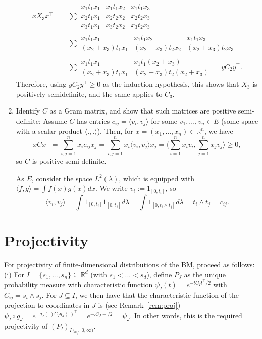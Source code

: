 \documentclass{article}
\theoremstyle{definition}
\theoremstyle{step} \newtheorem{step}{Step}
\begin{document}
\begin{enumerate}
\begin{align*}
    x X_3 x^\top & = \sum \begin{matrix} x_1 t_1 x_1 & x_1 t_1x_2 &
      x_1 t_1 x_3 \\ x_2 t_1 x_1 & x_2 t_2 x_2 & x_2 t_2x_3 \\ x_3 t_1
      x_1 & x_3 t_2 x_2& x_3 t_2x_3\end{matrix} \\ & =
      \sum \begin{matrix} x_1 t_1 x_1 & x_1 t_1x_2 & x_1 t_1 x_3
        \\ (x_2 + x_3) t_1 x_1 & (x_2 + x_3) t_2 x_2 & (x_2 +
        x_3)t_2x_3 \end{matrix} \\ & = \sum \begin{matrix} x_1 t_1 x_1
        & x_1 t_1(x_2 + x_3) \\ (x_2 + x_3) t_1 x_1 & (x_2 + x_3) t_2
        (x_2 + x_3) \end{matrix} = y C_2 y^\top.
  \end{align*}
  Therefore, using $y C_2 y^\top \geq 0$ as the induction hypothesis,
  this shows that $X_3$ is positively semidefinite, and the same
  applies to $C_3$.
\item Identify $C$ as a Gram matrix, and show that such matrices are positive semi-definite: Assume $C$ has entries $c_{ij} = \langle v_i, v_j\rangle$ for some $v_1,...,v_n \in E$ (some space with a scalar product $\langle .,. \rangle$). Then, for $x =
  (x_1,...,x_n) \in \mathbb R^n$, we have
  $$ x C x^\top = \sum_{i,j=1}^n x_i c_{ij} x_j = \sum_{i,j=1}^n
  x_i \langle v_i, v_j\rangle x_j = \langle \sum_{i=1}^n x_i v_i,
  \sum_{j=1}^n x_j v_j\rangle \geq 0,$$ so $C$ is positive semi-definite.

  As $E$, consider the space $L^2(\lambda)$, which is equipped with $\langle f, g\rangle = \int f(x)g(x) dx$. We write $v_i := 1_[0,t_i]$, so 
  $$ \langle v_i, v_j \rangle = \int 1_{[0,t_i]}1_{[0,t_j]} d\lambda = \int 1_{[0,t_i \wedge t_j]} d\lambda = t_i \wedge t_j = c_{ij}.$$
\end{enumerate}


\section{Projectivity}\label{S:proj}
For projectivity of finite-dimensional distributions of the BM,
proceed as follows: (i) For $I = \{s_1,...,s_n\} \subseteq \mathbb
R^d$ (with $s_1 < ... < s_d$), define $P_J$ as the unique probability
measure with characteristic function $\psi_I(t) = e^{-tC_It^\top/2}$
with $C_{ij} = s_i \wedge s_j$. For $J\subseteq I$, we then have that
the characteristic function of the projection to coordinates in $J$ is
(see Remark~\ref{rem:proj}) $\psi_I \circ g_J = e^{- g_J(.)  C_I
  g_J(.)^\top} = e^{- . C_J -/2} = \psi_J$. In other words, this is
the required projectivity of $(P_I)_{I \subseteq_f [0,\infty)}$.
\end{document}
